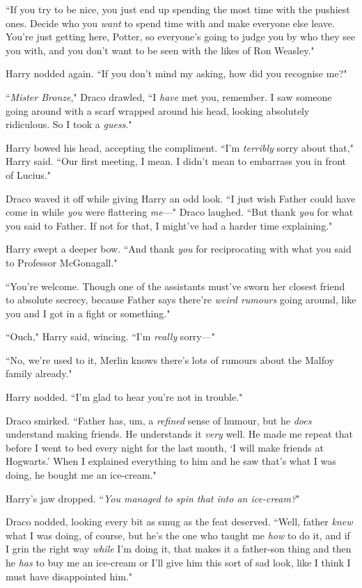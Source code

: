 ``If you try to be nice, you just end up spending the most time with the pushiest ones. Decide who you \emph{want} to spend time with and make everyone else leave. You're just getting here, Potter, so everyone's going to judge you by who they see you with, and you don't want to be seen with the likes of Ron Weasley."

Harry nodded again. ``If you don't mind my asking, how did you recognise me?"

``\emph{Mister Bronze}," Draco drawled, ``I \emph{have} met you, remember. I saw someone going around with a scarf wrapped around his head, looking absolutely ridiculous. So I took a \emph{guess}."

Harry bowed his head, accepting the compliment. ``I'm \emph{terribly} sorry about that," Harry said. ``Our first meeting, I mean. I didn't mean to embarrass you in front of Lucius."

Draco waved it off while giving Harry an odd look. ``I just wish Father could have come in while \emph{you} were flattering \emph{me}—" Draco laughed. ``But thank \emph{you} for what you said to Father. If not for that, I might've had a harder time explaining."

Harry swept a deeper bow. ``And thank \emph{you} for reciprocating with what you said to Professor McGonagall."

``You're welcome. Though one of the assistants must've sworn her closest friend to absolute secrecy, because Father says there're \emph{weird rumours} going around, like you and I got in a fight or something."

``Ouch," Harry said, wincing. ``I'm \emph{really} sorry—"

``No, we're used to it, Merlin knows there's lots of rumours about the Malfoy family already."

Harry nodded. ``I'm glad to hear you're not in trouble."

Draco smirked. ``Father has, um, a \emph{refined} sense of humour, but he \emph{does} understand making friends. He understands it \emph{very} well. He made me repeat that before I went to bed every night for the last month, `I will make friends at Hogwarts.' When I explained everything to him and he saw that's what I was doing, he bought me an ice-cream."

Harry's jaw dropped. ``\emph{You managed to spin that into an ice-cream?}"

Draco nodded, looking every bit as smug as the feat deserved. ``Well, father \emph{knew} what I was doing, of course, but he's the one who taught me \emph{how} to do it, and if I grin the right way \emph{while} I'm doing it, that makes it a father-son thing and then he \emph{has} to buy me an ice-cream or I'll give him this sort of sad look, like I think I must have disappointed him."

